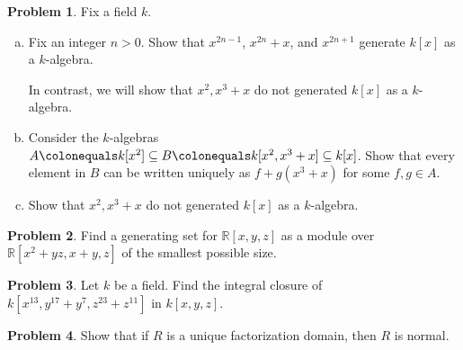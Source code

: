\documentclass[11pt]{article}
\theoremstyle{definition}
\newtheorem{problem}{Problem}
\begin{document}
\begin{problem} Fix a field $k$.
\begin{enumerate}[a)]
	\item Fix an integer $n > 0$. Show that $x^{2n-1}$, $x^{2n}+x$, and $x^{2n+1}$ generate $k[x]$ as a $k$-algebra.
	
	\vspace{0.5em}
	
	In contrast, we will show that $x^2, x^3+x$ do not generated $k[x]$ as a $k$-algebra.
	\item Consider the $k$-algebras $A \colonequals k[x^2] \subseteq B \colonequals k[x^2,x^3+x] \subseteq k[x]$. Show that every element in $B$ can be written uniquely as $f + g(x^3+x)$ for some $f, g \in A$. 
	\item Show that $x^2, x^3+x$ do not generated $k[x]$ as a $k$-algebra.
\end{enumerate}
\end{problem}

\begin{problem}
	Find a generating set for $\mathbb{R}[x,y,z]$ as a module over $\mathbb{R}[x^2+yz,x+y,z]$ of the smallest possible size.
\end{problem}

\begin{problem}
	Let $k$ be a field. Find the integral closure of $k[x^{13}, y^{17}+y^7, z^{23}+z^{11}]$ in $k[x,y,z]$.
\end{problem}

\begin{problem}
	 Show that if $R$ is a unique factorization domain, then $R$ is normal.
\end{problem}
\end{document}
